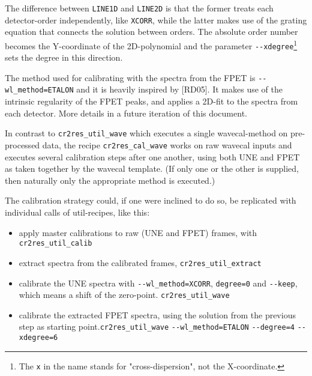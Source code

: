 The difference between \verb!LINE1D! and \verb!LINE2D! is that the former treats
each detector-order independently, like \verb!XCORR!, while the latter makes use
of the grating equation that connects the solution between orders. The absolute
order number becomes the Y-coordinate of the 2D-polynomial and the parameter
\verb!--xdegree!\footnote{The \texttt{x} in the name stands for
"cross-dispersion", not the X-coordinate.} sets the degree in this direction.




The method used for calibrating with the spectra from the FPET is
\verb!--wl_method=ETALON! and it is heavily inspired by
[RD05]\cite{2019A&A...624A.122C}. It makes use of the intrinsic regularity of
the FPET peaks, and applies a 2D-fit to the spectra from each detector. More
details in a future iteration of this document.


In contrast to \verb!cr2res_util_wave! which executes a single wavecal-method on
pre-processed data, the recipe \texttt{cr2res\_cal\_wave} works on raw wavecal
inputs and executes several calibration steps after one another, using both UNE
and FPET as taken together by the wavecal template. (If only one or the other is supplied, then naturally only the appropriate method is executed.)

The calibration strategy could, if one were inclined to do so, be replicated
with individual calls of util-recipes, like this:

\begin{itemize}
    \item apply master calibrations to raw (UNE and FPET) frames, with \verb!cr2res_util_calib!
    \item extract spectra from the calibrated frames, \verb!cr2res_util_extract!
    \item calibrate the UNE spectra with \verb!--wl_method=XCORR!, \verb!degree=0! and \verb!--keep!, which means a shift of the zero-point.  \verb!cr2res_util_wave!
    \item calibrate the extracted FPET spectra, using the solution from the previous step as starting point.\linebreak\verb!cr2res_util_wave! \verb!--wl_method=ETALON! \verb!--degree=4! \verb!--xdegree=6!
\end{itemize}

